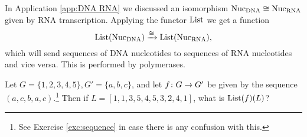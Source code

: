 \documentclass[CT4S-EN-RU]{subfiles}
\begin{document}
\begin{application}\label{app:polymerase}
In Application \ref{app:DNA RNA} we discussed an isomorphism $\textnormal{Nuc}_\textnormal{DNA}\cong\textnormal{Nuc}_\textnormal{RNA}$ given by RNA transcription. Applying the functor $\textnormal{List}$ we get a function $$\textnormal{List}(\textnormal{Nuc}_\textnormal{DNA})\xrightarrow{\cong}\textnormal{List}(\textnormal{Nuc}_\textnormal{RNA}),$$ which will send sequences of DNA nucleotides to sequences of RNA nucleotides and vice versa. This is performed by polymerases.

\end{application}

\begin{exercise}\label{exc:list as functor}
Let $G=\{1,2,3,4,5\}, G'=\{a,b,c\}$, and let $f\colon G\rightarrow G'$ be given by the sequence $(a,c,b,a,c)$.\footnote{See Exercise \ref{exc:sequence} in case there is any confusion with this.} Then if $L=[1,1,3,5,4,5,3,2,4,1]$, what is $\textnormal{List}(f)(L)$?
\end{exercise}
\end{document}
